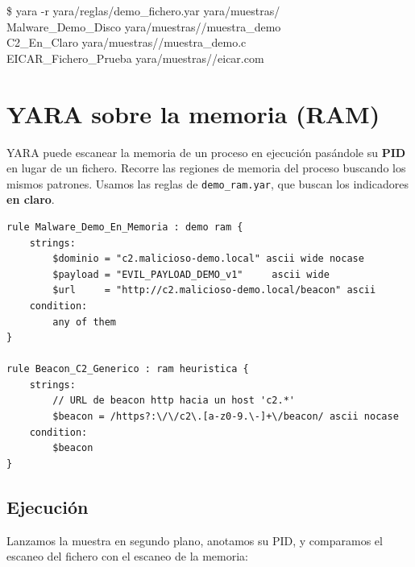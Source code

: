 \documentclass[11pt,a4paper]{article}
\begin{document}
\begin{terminal}
\$ yara -r yara/reglas/demo\_fichero.yar yara/muestras/\\
Malware\_Demo\_Disco yara/muestras//muestra\_demo\\
C2\_En\_Claro       yara/muestras//muestra\_demo.c\\
EICAR\_Fichero\_Prueba yara/muestras//eicar.com
\end{terminal}

\section{YARA sobre la memoria (RAM)}

YARA puede escanear la memoria de un proceso en ejecución pasándole su
\textbf{PID} en lugar de un fichero. Recorre las regiones de memoria del proceso
buscando los mismos patrones. Usamos las reglas de \texttt{demo\_ram.yar}, que
buscan los indicadores \textbf{en claro}.

\begin{lstlisting}[style=yara,caption={\texttt{yara/reglas/demo\_ram.yar}},captionpos=b]
rule Malware_Demo_En_Memoria : demo ram {
    strings:
        $dominio = "c2.malicioso-demo.local" ascii wide nocase
        $payload = "EVIL_PAYLOAD_DEMO_v1"     ascii wide
        $url     = "http://c2.malicioso-demo.local/beacon" ascii
    condition:
        any of them
}

rule Beacon_C2_Generico : ram heuristica {
    strings:
        // URL de beacon http hacia un host 'c2.*'
        $beacon = /https?:\/\/c2\.[a-z0-9.\-]+\/beacon/ ascii nocase
    condition:
        $beacon
}
\end{lstlisting}

\subsection*{Ejecución}

Lanzamos la muestra en segundo plano, anotamos su PID, y comparamos el escaneo
del fichero con el escaneo de la memoria:
\end{document}
